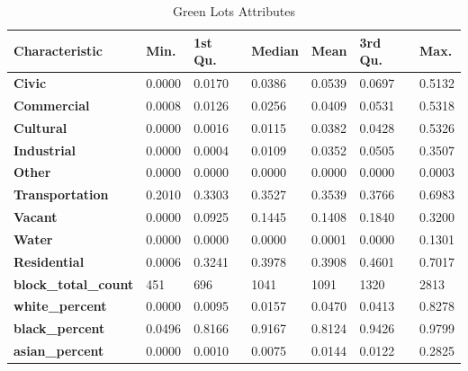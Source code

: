 \documentclass{article}
\begin{document}
\begin{table}[H]
\begin{center}
\caption{\label{tab:ae}Green Lots Attributes}
\begin{tabular}{lllllll}
\hline
\textbf{Characteristic}      & \textbf{Min.} & \textbf{1st Qu.} & \textbf{Median} & \textbf{Mean} & \textbf{3rd Qu.} & \textbf{Max.} \\ \hline
\textbf{Civic}               & 0.0000        & 0.0170           & 0.0386          & 0.0539        & 0.0697           & 0.5132        \\
\textbf{Commercial}          & 0.0008        & 0.0126           & 0.0256          & 0.0409        & 0.0531           & 0.5318        \\
\textbf{Cultural}            & 0.0000        & 0.0016           & 0.0115          & 0.0382        & 0.0428           & 0.5326        \\
\textbf{Industrial}          & 0.0000        & 0.0004           & 0.0109          & 0.0352        & 0.0505           & 0.3507        \\
\textbf{Other}               & 0.0000        & 0.0000           & 0.0000          & 0.0000        & 0.0000           & 0.0003        \\
\textbf{Transportation}      & 0.2010        & 0.3303           & 0.3527          & 0.3539        & 0.3766           & 0.6983        \\
\textbf{Vacant}              & 0.0000        & 0.0925           & 0.1445          & 0.1408        & 0.1840           & 0.3200        \\
\textbf{Water}               & 0.0000        & 0.0000           & 0.0000          & 0.0001        & 0.0000           & 0.1301        \\
\textbf{Residential}         & 0.0006        & 0.3241           & 0.3978          & 0.3908        & 0.4601           & 0.7017        \\
\textbf{block\_total\_count} & 451           & 696              & 1041            & 1091          & 1320             & 2813          \\
\textbf{white\_percent}      & 0.0000        & 0.0095           & 0.0157          & 0.0470        & 0.0413           & 0.8278        \\
\textbf{black\_percent}      & 0.0496        & 0.8166           & 0.9167          & 0.8124        & 0.9426           & 0.9799        \\
\textbf{asian\_percent}      & 0.0000        & 0.0010           & 0.0075          & 0.0144        & 0.0122           & 0.2825        \\

\end{tabular}
\end{center}
\end{table}
\end{document}
